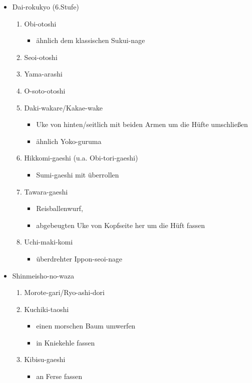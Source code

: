 \documentclass[justified, a4paper, notitlepage, captions=tableheading, nobib]{tufte-handout}
\begin{document}
\begin{itemize}
\item Dai-rokukyo (6.Stufe)
\begin{enumerate}
\item Obi-otoshi
\begin{itemize}
\item ähnlich dem klassischen Sukui-nage
\end{itemize}
\item Seoi-otoshi
\item Yama-arashi
\item O-soto-otoshi
\item Daki-wakare/Kakae-wake
\begin{itemize}
\item Uke von hinten/seitlich mit beiden Armen um die Hüfte umschließen
\item ähnlich Yoko-guruma
\end{itemize}
\item Hikkomi-gaeshi (u.a. Obi-tori-gaeshi)
\begin{itemize}
\item Sumi-gaeshi mit überrollen
\end{itemize}
\item Tawara-gaeshi 
\begin{itemize}
\item Reisballenwurf,
\item abgebeugten Uke von Kopfseite her um die Hüft fassen
\end{itemize}
\item Uchi-maki-komi
\begin{itemize}
\item überdrehter Ippon-seoi-nage
\end{itemize}
\end{enumerate}
\item \label{orge24b670}Shinmeisho-no-waza
\begin{enumerate}
\item Morote-gari/Ryo-ashi-dori
\item Kuchiki-taoshi
\begin{itemize}
\item einen morschen Baum umwerfen
\item in Kniekehle fassen
\end{itemize}
\item Kibisu-gaeshi
\begin{itemize}
\item an Ferse fassen
\end{itemize}

\end{enumerate}
\end{itemize}
\end{document}

